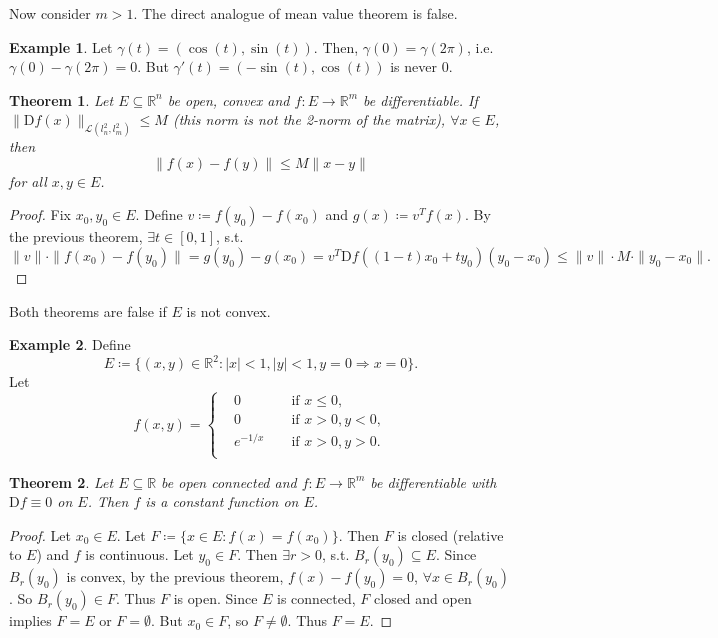 \documentclass[12pt]{article}
\theoremstyle{plain}
\newtheorem{thm}{Theorem}
\theoremstyle{definition}
\newtheorem*{eg}{Example}
\begin{document}
Now consider $m>1$.
The direct analogue of mean value theorem is false.
\begin{eg}
    Let $\gamma(t) = (\cos(t), \sin(t))$.
    Then, $\gamma(0) = \gamma(2\pi)$, i.e. $\gamma(0)-\gamma(2\pi) = 0$.
    But $\gamma'(t) = (-\sin(t), \cos(t))$ is never $0$.
\end{eg}

\begin{thm}
    Let $E\subseteq \mathbb{R}^n$ be open, convex and $f:E\rightarrow \mathbb{R}^m$ be differentiable.
    If $\|\mathrm{D}f(x)\|_{\mathcal{L}(l^2_n, l^2_m)} \leq M$ (this norm is not the 2-norm of the matrix), $\forall x\in E$,
    then
    \[
        \|f(x) - f(y)\| \leq M\|x-y\|
    \]
    for all $x,y\in E$.
\end{thm}
\begin{proof}
    Fix $x_0, y_0\in E$.
    Define $v\coloneqq f(y_0) - f(x_0)$ and $g(x)\coloneqq v^T f(x)$.
    By the previous theorem, $\exists t\in[0,1]$, s.t.\
    \[
        \|v\|\cdot\|f(x_0) - f(y_0)\| = g(y_0) - g(x_0) = v^T\mathrm{D}f((1-t)x_0+ty_0)(y_0-x_0) \leq \|v\|\cdot M\cdot\|y_0-x_0\|.
    \]
\end{proof}

Both theorems are false if $E$ is not convex.
\begin{eg}
    Define
    \[
        E\coloneqq \{(x,y)\in\mathbb{R}^2: |x|<1, |y|<1, y=0\Rightarrow x=0\}.
    \]
    Let
    \[
        f(x,y)=\left\{
            \begin{aligned}
                &0\qquad&&\text{if }x\leq 0,\\
                &0\qquad&&\text{if }x>0, y<0,\\
                &e^{-1/x}&&\text{if }x>0, y>0.\\
            \end{aligned}
        \right.
    \]
\end{eg}

\begin{thm}
    Let $E\subseteq \mathbb{R}$ be open connected and $f: E\rightarrow \mathbb{R}^m$ be differentiable with $\mathrm{D}f \equiv 0$ on $E$.
    Then $f$ is a constant function on $E$.
\end{thm}
\begin{proof}
    Let $x_0\in E$.
    Let $F\coloneqq \{x\in E: f(x) = f(x_0)\}$.
    Then $F$ is closed (relative to $E$) and $f$ is continuous.
    Let $y_0\in F$.
    Then $\exists r>0$, s.t. $B_r(y_0)\subseteq E$. %
    Since $B_r(y_0)$ is convex, by the previous theorem, $f(x) - f(y_0) = 0$, $\forall x\in B_r(y_0)$.
    So $B_r(y_0)\in F$.
    Thus $F$ is open.
    Since $E$ is connected, $F$ closed and open implies $F=E$ or $F=\emptyset$.
    But $x_0\in F$, so $F\neq \emptyset$.
    Thus $F = E$.
\end{proof}
\end{document}
